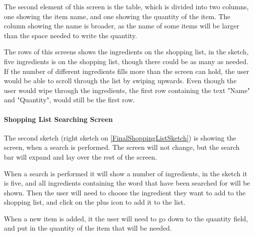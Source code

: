 The second element of this screen is the table, which is divided into two columns, one showing the item name, and one showing the quantity of the item. The column showing the name is broader, as the name of some items will be larger than the space needed to write the quantity.

The rows of this screens shows the ingredients on the shopping list, in the sketch, five ingredients is on the shopping list, though there could be as many as needed. If the number of different ingredients fills more than the screen can hold, the user would be able to scroll through the list by swiping upwards. Even though the user would wipe through the ingredients, the first row containing the text "Name" and "Quantity", would still be the first row.

\paragraph{Shopping List Searching Screen}

The second sketch (right sketch on \ref{FinalShoppingListSketch})  is showing the screen, when a search is performed. The screen will not change, but the search bar will expand and lay over the rest of the screen.

When a search is performed it will show a number of ingredients, in the sketch it is five, and all ingredients containing the word that have been searched for will be shown. Then the user will need to choose the ingredient they want to add to the shopping list, and click on the plus icon to add it to the list.

When a new item is added, it the user will need to go down to the quantity field, and put in the quantity of the item that will be needed.